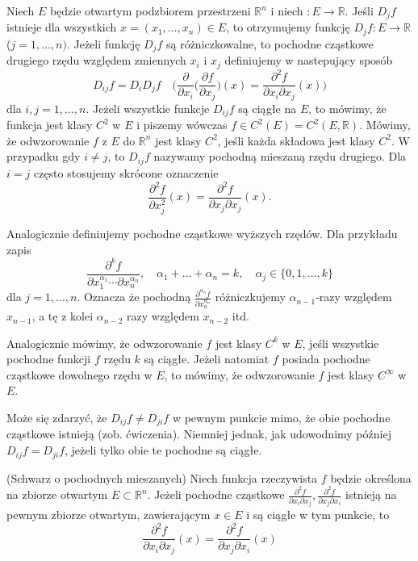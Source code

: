 \documentclass[leqno]{article}
\begin{document}
\begin{justify}
\begin{defn}
    Niech $E$ będzie otwartym podzbiorem przestrzeni $\mathbb{R}^n$ i niech $ : E \to \mathbb{R}$. Jeśli $D_j f$ istnieje 
    dla wszystkich $x = (x_1, \ldots, x_n) \in E$, to otrzymujemy funkcję $D_j f : E \to \mathbb{R}$ ($j = 1, \ldots, n)$.
    Jeżeli funkcję $D_j f$ są różniczkowalne, to pochodne cząstkowe drugiego rzędu względem zmiennych $x_i$ i $x_j$ definiujemy w nastepujący sposób 
    \[
        D_{ij}f = D_i D_j f \quad \Big( \frac{\partial}{\partial x_i}\Big( \frac{\partial f}{\partial x_j}\Big)(x) = \frac{\partial ^2 f}{\partial x_i \partial x_j}(x)\Big)
    \]
    dla $i,j = 1, \ldots, n$. Jeżeli wszystkie funkcje $D_{ij} f$ są ciągłe na $E$, to mówimy, że funkcja jest klasy $C^2$ w $E$ i piszemy wówczas 
    $f \in C^2(E) = C^2(E, \mathbb{R})$. Mówimy, że odwzorowanie $f$ z $E$ do $\mathbb{R}^n$ jest klasy $C^2$, jeśli każda składowa jest klasy $C^2$.
    W przypadku gdy $i \neq j$, to $D_{ij}f$ nazywamy pochodną mieszaną rzędu drugiego. Dla $i = j$ często stosujemy skrócone oznaczenie 
    \[
        \frac{\partial^2 f}{\partial x^2_j}(x) = \frac{\partial ^2f}{\partial x_j \partial x_j}(x).
    \]
\end{defn}

Analogicznie definiujemy pochodne cząstkowe wyższych rzędów. Dla przykładu zapis 
\[
    \frac{\partial ^k f}{\partial x_1^{\alpha_1}\cdots \partial x_n ^{\alpha_n}}, \quad \alpha_1 + \ldots + \alpha_n = k, \quad \alpha_j \in \{0, 1, \ldots, k\}
\]
dla $j = 1,\ldots, n$. Oznacza że pochodną $\frac{\partial ^{\alpha_n} f}{\partial x_n^{\alpha_n}}$ różniczkujemy $\alpha_{n-1}$-razy względem $x_{n-1}$, a tę 
z kolei $\alpha_{n-2}$ razy względem $x_{n-2}$ itd.

Analogicznie mówimy, że odwzorowanie $f$ jest klasy $C^k$ w $E$, jeśli wszystkie pochodne funkcji $f$ rzędu $k$ są ciągłe. Jeżeli natomiat 
$f$ posiada pochodne cząstkowe dowolnego rzędu w $E$, to mówimy, że odwzorowanie $f$ jest klasy $C^\infty$ w $E$.

\begin{uwaga}
    Może się zdarzyć, że $D_{ij}f \neq D_{ji} f$ w pewnym punkcie mimo, że obie pochodne cząstkowe istnieją (zob. ćwiczenia). Niemniej jednak, jak udowodnimy później
    $D_{ij} f = D_{ji} f$, jeżeli tylko obie te pochodne są ciągłe.
\end{uwaga}

\begin{theorem}
{
    (Schwarz o pochodnych mieszanych) Niech funkcja rzeczywista $f$ będzie określona na zbiorze otwartym $E \subset \mathbb{R}^n$.
    Jeżeli pochodne cząstkowe $\frac{\partial ^2 f}{\partial x_i \partial x_j}, \frac{\partial ^2 f}{\partial x_j \partial x_i}$ istnieją 
    na pewnym zbiorze otwartym, zawierającym $x \in E$ i są ciągłe w tym punkcie, to 
    \[
        \frac{\partial ^2 f}{\partial x_i \partial x_j}(x) = \frac{\partial ^2 f}{\partial x_j \partial x_i}(x)
    \]  
}
\end{theorem}


\end{justify}
\end{document}
